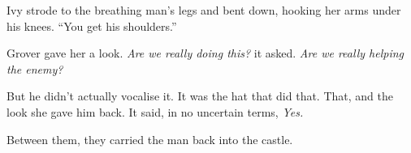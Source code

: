Ivy strode to the breathing man's legs and bent down, hooking her arms under his knees.
``You get his shoulders.''

Grover gave her a look.
\emph{Are we really doing this?} it asked.
\emph{Are we really helping the enemy?}

But he didn't actually vocalise it.
It was the hat that did that.
That, and the look she gave him back.
It said, in no uncertain terms, \emph{Yes.}

\storybreak

Between them, they carried the man back into the castle.
